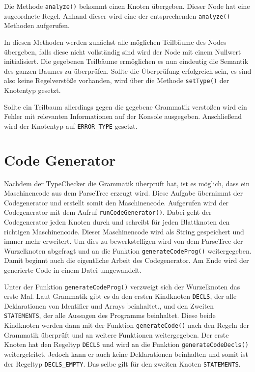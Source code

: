 Die Methode \texttt{analyze()} bekommt einen Knoten übergeben. Dieser Node hat eine zugeordnete Regel. Anhand dieser wird eine der entsprechenden \texttt{analyze()} Methoden aufgerufen.

In diesen Methoden werden zunächst alle möglichen Teilbäume des Nodes übergeben, falls diese nicht vollständig sind wird der Node mit einem Nullwert initialisiert.
Die gegebenen Teilbäume ermöglichen es nun eindeutig die Semantik des ganzen Baumes zu überprüfen. Sollte die Überprüfung erfolgreich sein, es sind also keine Regelverstöße vorhanden, wird über die Methode \texttt{setType()} der Knotentyp gesetzt.

Sollte ein Teilbaum allerdings gegen die gegebene Grammatik verstoßen wird ein Fehler mit relevanten Informationen auf der Konsole ausgegeben. Anschließend wird der Knotentyp auf \texttt{ERROR\_TYPE} gesetzt.

\section{Code Generator}
Nachdem der TypeChecker die Grammatik überprüft hat, ist es möglich, dass ein Maschinencode aus dem ParseTree erzeugt wird. Diese Aufgabe übernimmt der Codegenerator und erstellt somit den Maschinencode. Aufgerufen wird der Codegenerator mit dem Aufruf \texttt{runCodeGenerator()}. Dabei geht der Codegenerator jeden Knoten durch und schreibt für jeden Blattknoten den richtigen Maschinencode. Dieser Maschinencode wird als String gespeichert und immer mehr erweitert. Um dies zu bewerkstelligen wird von dem ParseTree der Wurzelknoten abgefragt und an die Funktion \texttt{generateCodeProg()} weitergegeben. Damit beginnt auch die eigentliche Arbeit des Codegenerator. Am Ende wird der generierte Code in einem Datei umgewandelt.



Unter der Funktion \texttt{generateCodeProg()} verzweigt sich der Wurzelknoten das erste Mal.  Laut Grammatik gibt es da den ersten Kindknoten \texttt{DECLS}, der alle Deklarationen von Identifier und Arrays beinhaltet., und den Zweiten \texttt{STATEMENTS}, der alle Aussagen des Programms beinhaltet. Diese beide Kindknoten werden dann mit der Funktion \texttt{generateCode()} nach den Regeln der Grammatik überprüft und an weitere Funktionen weitergegeben. Der erste Knoten hat den Regeltyp \texttt{DECLS} und wird an die Funktion \texttt{generateCodeDecls()} weitergeleitet. Jedoch kann er auch keine Deklarationen beinhalten und somit ist der  Regeltyp \texttt{DECLS\_EMPTY}. Das selbe gilt für den zweiten Knoten \texttt{STATEMENTS}.

